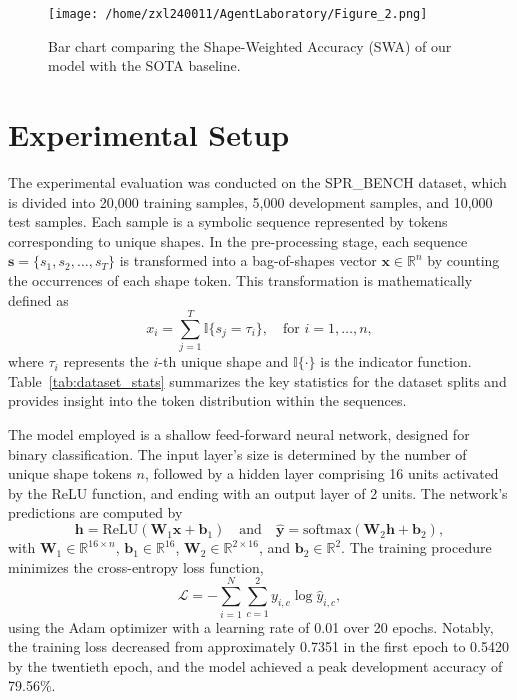 \documentclass{article}
\begin{document}
\begin{figure}[h]
\caption{Bar chart comparing the Shape-Weighted Accuracy (SWA) of our model with the SOTA baseline.}
\centering
\texttt{[image: /home/zxl240011/AgentLaboratory/Figure\_2.png]}
\label{fig:fig2}
\end{figure}

\section{Experimental Setup}
The experimental evaluation was conducted on the SPR\_BENCH dataset, which is divided into 20,000 training samples, 5,000 development samples, and 10,000 test samples. Each sample is a symbolic sequence represented by tokens corresponding to unique shapes. In the pre-processing stage, each sequence \(\boldsymbol{s} = \{s_1, s_2, \dots, s_T\}\) is transformed into a bag-of-shapes vector \(\boldsymbol{x} \in \mathbb{R}^n\) by counting the occurrences of each shape token. This transformation is mathematically defined as
\[
x_i = \sum_{j=1}^{T} \mathbb{I}\{ s_j = \tau_i \}, \quad \text{for } i = 1, \dots, n,
\]
where \(\tau_i\) represents the \(i\)-th unique shape and \(\mathbb{I}\{\cdot\}\) is the indicator function. Table~\ref{tab:dataset_stats} summarizes the key statistics for the dataset splits and provides insight into the token distribution within the sequences.

The model employed is a shallow feed-forward neural network, designed for binary classification. The input layer’s size is determined by the number of unique shape tokens \(n\), followed by a hidden layer comprising 16 units activated by the ReLU function, and ending with an output layer of 2 units. The network’s predictions are computed by
\[
\boldsymbol{h} = \text{ReLU}(\mathbf{W}_1 \boldsymbol{x} + \mathbf{b}_1) \quad \text{and} \quad \hat{\boldsymbol{y}} = \text{softmax}(\mathbf{W}_2 \boldsymbol{h} + \mathbf{b}_2),
\]
with \(\mathbf{W}_1 \in \mathbb{R}^{16 \times n}\), \(\mathbf{b}_1 \in \mathbb{R}^{16}\), \(\mathbf{W}_2 \in \mathbb{R}^{2 \times 16}\), and \(\mathbf{b}_2 \in \mathbb{R}^{2}\). The training procedure minimizes the cross-entropy loss function,
\[
\mathcal{L} = -\sum_{i=1}^{N} \sum_{c=1}^{2} y_{i,c} \log \hat{y}_{i,c},
\]
using the Adam optimizer with a learning rate of 0.01 over 20 epochs. Notably, the training loss decreased from approximately 0.7351 in the first epoch to 0.5420 by the twentieth epoch, and the model achieved a peak development accuracy of 79.56\%.
\end{document}
